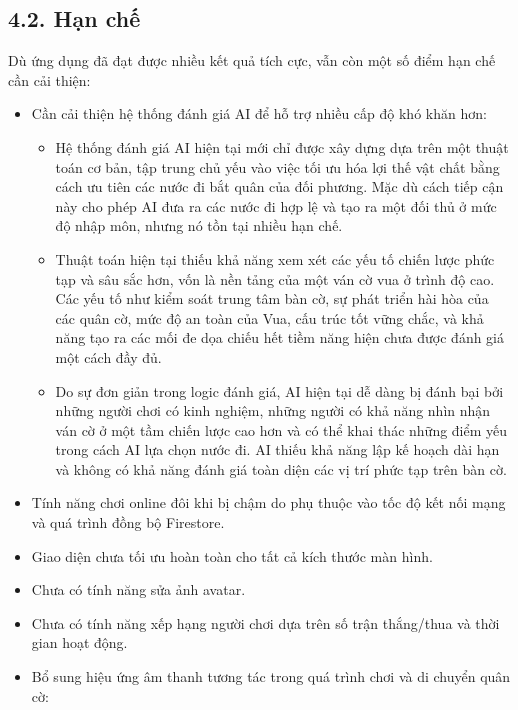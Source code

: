 \documentclass[a4paper,12pt]{article}
\begin{document}
\subsection*{4.2. Hạn chế} %

\justify
\noindent Dù ứng dụng đã đạt được nhiều kết quả tích cực, vẫn còn một số điểm hạn chế cần cải thiện:
\begin{itemize}[label=·]
    \item Cần cải thiện hệ thống đánh giá AI để hỗ trợ nhiều cấp độ khó khăn hơn:
    \begin{itemize}[label=$\circ$]
        \item Hệ thống đánh giá AI hiện tại mới chỉ được xây dựng dựa trên một thuật toán cơ bản, tập trung chủ yếu vào việc tối ưu hóa lợi thế vật chất bằng cách ưu tiên các nước đi bắt quân của đối phương. Mặc dù cách tiếp cận này cho phép AI đưa ra các nước đi hợp lệ và tạo ra một đối thủ ở mức độ nhập môn, nhưng nó tồn tại nhiều hạn chế.
        \item Thuật toán hiện tại thiếu khả năng xem xét các yếu tố chiến lược phức tạp và sâu sắc hơn, vốn là nền tảng của một ván cờ vua ở trình độ cao. Các yếu tố như kiểm soát trung tâm bàn cờ, sự phát triển hài hòa của các quân cờ, mức độ an toàn của Vua, cấu trúc tốt vững chắc, và khả năng tạo ra các mối đe dọa chiếu hết tiềm năng hiện chưa được đánh giá một cách đầy đủ.
        \item Do sự đơn giản trong logic đánh giá, AI hiện tại dễ dàng bị đánh bại bởi những người chơi có kinh nghiệm, những người có khả năng nhìn nhận ván cờ ở một tầm chiến lược cao hơn và có thể khai thác những điểm yếu trong cách AI lựa chọn nước đi. AI thiếu khả năng lập kế hoạch dài hạn và không có khả năng đánh giá toàn diện các vị trí phức tạp trên bàn cờ.
    \end{itemize}
    \item Tính năng chơi online đôi khi bị chậm do phụ thuộc vào tốc độ kết nối mạng và quá trình đồng bộ Firestore.
    \item Giao diện chưa tối ưu hoàn toàn cho tất cả kích thước màn hình.
    \item Chưa có tính năng sửa ảnh avatar.
    \item Chưa có tính năng xếp hạng người chơi dựa trên số trận thắng/thua và thời gian hoạt động.
    \item Bổ sung hiệu ứng âm thanh tương tác trong quá trình chơi và di chuyển quân cờ:
    \begin{itemize}[label=$\circ$]

\end{itemize}
\end{itemize}
\end{document}
